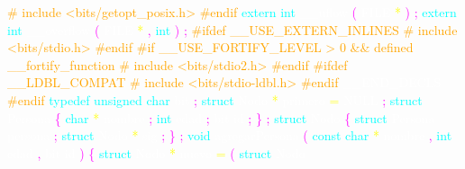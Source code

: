 \textcolor{orange}{\# include <bits/getopt\_posix.h>} 
\textcolor{orange}{\#endif} 
\textcolor{cyan}{extern} 
\textcolor{cyan}{int} 
\textcolor{white}{\_\_uflow} 
\textcolor{magenta}{(} 
\textcolor{white}{FILE} 
\textcolor{yellow}{*} 
\textcolor{magenta}{)} 
\textcolor{magenta}{;} 
\textcolor{cyan}{extern} 
\textcolor{cyan}{int} 
\textcolor{white}{\_\_overflow} 
\textcolor{magenta}{(} 
\textcolor{white}{FILE} 
\textcolor{yellow}{*} 
\textcolor{magenta}{,} 
\textcolor{cyan}{int} 
\textcolor{magenta}{)} 
\textcolor{magenta}{;} 
\textcolor{orange}{\#ifdef \_\_USE\_EXTERN\_INLINES} 
\textcolor{orange}{\# include <bits/stdio.h>} 
\textcolor{orange}{\#endif} 
\textcolor{orange}{\#if \_\_USE\_FORTIFY\_LEVEL > 0 \&\& defined \_\_fortify\_function} 
\textcolor{orange}{\# include <bits/stdio2.h>} 
\textcolor{orange}{\#endif} 
\textcolor{orange}{\#ifdef \_\_LDBL\_COMPAT} 
\textcolor{orange}{\# include <bits/stdio-ldbl.h>} 
\textcolor{orange}{\#endif} 
\textcolor{white}{\_\_END\_DECLS} 
\textcolor{orange}{\#endif} 
\textcolor{cyan}{typedef} 
\textcolor{cyan}{unsigned} 
\textcolor{cyan}{char} 
\textcolor{white}{bit} 
\textcolor{magenta}{;} 
\textcolor{cyan}{struct} 
\textcolor{white}{Nodo} 
\textcolor{yellow}{*} 
\textcolor{white}{primero} 
\textcolor{yellow}{=} 
\textcolor{white}{NULL} 
\textcolor{magenta}{;} 
\textcolor{cyan}{struct} 
\textcolor{white}{Persona} 
\textcolor{magenta}{\{} 
\textcolor{cyan}{char} 
\textcolor{yellow}{*} 
\textcolor{white}{nombre} 
\textcolor{magenta}{;} 
\textcolor{cyan}{int} 
\textcolor{white}{edad} 
\textcolor{magenta}{;} 
\textcolor{white}{bit} 
\textcolor{white}{id} 
\textcolor{magenta}{;} 
\textcolor{magenta}{\}} 
\textcolor{magenta}{;} 
\textcolor{cyan}{struct} 
\textcolor{white}{Nodo} 
\textcolor{magenta}{\{} 
\textcolor{cyan}{struct} 
\textcolor{white}{Persona} 
\textcolor{white}{persona} 
\textcolor{magenta}{;} 
\textcolor{cyan}{struct} 
\textcolor{white}{Nodo} 
\textcolor{yellow}{*} 
\textcolor{white}{sig} 
\textcolor{magenta}{;} 
\textcolor{magenta}{\}} 
\textcolor{magenta}{;} 
\textcolor{cyan}{void} 
\textcolor{white}{agregarPersona} 
\textcolor{magenta}{(} 
\textcolor{cyan}{const} 
\textcolor{cyan}{char} 
\textcolor{yellow}{*} 
\textcolor{white}{nombre} 
\textcolor{magenta}{,} 
\textcolor{cyan}{int} 
\textcolor{white}{edad} 
\textcolor{magenta}{,} 
\textcolor{white}{bit} 
\textcolor{white}{id} 
\textcolor{magenta}{)} 
\textcolor{magenta}{\{} 
\textcolor{cyan}{struct} 
\textcolor{white}{Nodo} 
\textcolor{yellow}{*} 
\textcolor{white}{nuevo} 
\textcolor{yellow}{=} 
\textcolor{magenta}{(} 
\textcolor{cyan}{struct} 
\textcolor{white}{Nodo} 
